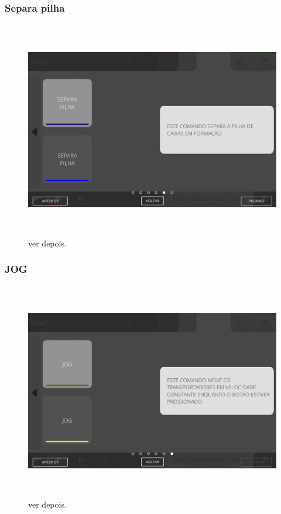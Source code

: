 \newpage
\thispagestyle{fancy}
\vspace*{\fill}
\subsubsection{\small{Separa pilha}}
\begin{figure}[h]
  \centering
  \includegraphics[width=576px,height=360px]{src/imagesFlexo/08-count/commands/e-12.png}
  \caption{ver depois.}
   \label{}
\end{figure}
\vspace*{\fill}

\newpage
\thispagestyle{fancy}
\vspace*{\fill}
\subsubsection{\small{JOG}}
\begin{figure}[h]
  \centering
  \includegraphics[width=576px,height=360px]{src/imagesFlexo/08-count/commands/e-13.png}
  \caption{ver depois.}
   \label{}
\end{figure}
\vspace*{\fill}
